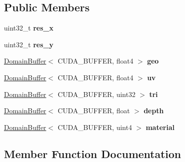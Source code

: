 \subsection*{Public Members}
\begin{DoxyCompactItemize}
\item 
\mbox{\label{struct_g_buffer_storage_a258a1487c734012b98e9228741c749c0}} 
uint32\+\_\+t {\bfseries res\+\_\+x}
\item 
\mbox{\label{struct_g_buffer_storage_adb9bc21bd1df3742c6561374534851c5}} 
uint32\+\_\+t {\bfseries res\+\_\+y}
\item 
\mbox{\label{struct_g_buffer_storage_a8a0d56d02cc05f76d8bc74a2e79d33e9}} 
\hyperlink{class_domain_buffer}{Domain\+Buffer}$<$ C\+U\+D\+A\+\_\+\+B\+U\+F\+F\+ER, float4 $>$ {\bfseries geo}
\item 
\mbox{\label{struct_g_buffer_storage_a7ca8cdb13ae66747a28951dd19a9ec1d}} 
\hyperlink{class_domain_buffer}{Domain\+Buffer}$<$ C\+U\+D\+A\+\_\+\+B\+U\+F\+F\+ER, float4 $>$ {\bfseries uv}
\item 
\mbox{\label{struct_g_buffer_storage_acfc75e200a8e87d7463cbaa835c7d3ed}} 
\hyperlink{class_domain_buffer}{Domain\+Buffer}$<$ C\+U\+D\+A\+\_\+\+B\+U\+F\+F\+ER, uint32 $>$ {\bfseries tri}
\item 
\mbox{\label{struct_g_buffer_storage_a1b31ff87d2a1b867447f4ce87762a1e1}} 
\hyperlink{class_domain_buffer}{Domain\+Buffer}$<$ C\+U\+D\+A\+\_\+\+B\+U\+F\+F\+ER, float $>$ {\bfseries depth}
\item 
\mbox{\label{struct_g_buffer_storage_a7612491ec2c94cfb55f93e0778b247d7}} 
\hyperlink{class_domain_buffer}{Domain\+Buffer}$<$ C\+U\+D\+A\+\_\+\+B\+U\+F\+F\+ER, uint4 $>$ {\bfseries material}
\end{DoxyCompactItemize}


\subsection{Member Function Documentation}
\mbox{\label{struct_g_buffer_storage_a9d8e6e8f1dc353833e1c18ae4304561e}} 
